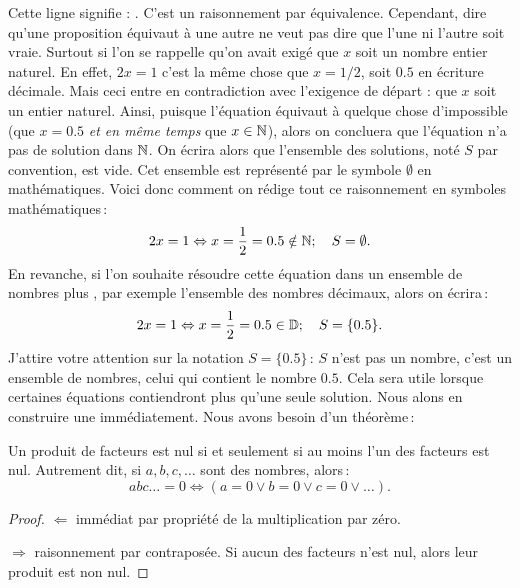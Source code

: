 		Cette ligne signifie : . C'est un raisonnement par équivalence. Cependant, dire qu'une proposition équivaut à une autre ne veut pas dire que l'une ni l'autre soit vraie. Surtout si l'on se rappelle qu'on avait exigé que $x$ soit un nombre entier naturel. En effet, $2x=1$ c'est la même chose que $x=1/2$, soit $0.5$ en écriture décimale. Mais ceci entre en contradiction avec l'exigence de départ : que $x$ soit un entier naturel. Ainsi, puisque l'équation équivaut à quelque chose d'impossible (que $x=0.5$ \emph{et en même temps} que $x\in\mathbb{N}$), alors on concluera que l'équation n'a pas de solution dans $\mathbb{N}$. On écrira alors que l'ensemble des solutions, noté $S$ par convention, est vide. Cet ensemble est représenté par le symbole $\emptyset$ en mathématiques. Voici donc comment on rédige tout ce raisonnement en symboles mathématiques\,:
		\begin{equation}
		 	2x=1\Leftrightarrow x=\frac{1}{2}=0.5\notin\mathbb{N} ; \quad S=\emptyset.
		\end{equation} 
		En revanche, si l'on souhaite résoudre cette équation dans un ensemble de nombres plus , par exemple l'ensemble des nombres décimaux, alors on écrira\,:
		\begin{equation}
		 	2x=1\Leftrightarrow x=\frac{1}{2}=0.5\in\mathbb{D} ; \quad S=\{0.5\}.
		\end{equation} 
		J'attire votre attention sur la notation $S=\{0.5\}$\,: $S$ n'est pas un nombre, c'est un ensemble de nombres, celui qui contient le nombre $0.5$. Cela sera utile lorsque certaines équations contiendront plus qu'une seule solution. 
		Nous alons en construire une immédiatement. Nous avons besoin d'un théorème\,:
		\begin{thm}
			Un produit de facteurs est nul si et seulement si au moins l'un des facteurs est nul. Autrement dit, si $a,b,c,\ldots$ sont des nombres, alors\,:
			\begin{equation}
				abc\ldots = 0 \Leftrightarrow(a=0\lor b=0 \lor c=0\lor \ldots).
			\end{equation}
		\end{thm}

		\begin{proof}
			$\Leftarrow$ immédiat par propriété de la multiplication par zéro.

			$\Rightarrow$ raisonnement par contraposée. Si aucun des facteurs n'est nul, alors leur produit est non nul.
		\end{proof}

